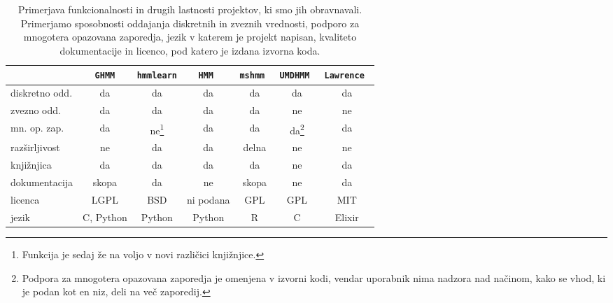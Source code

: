 \begin{table}
\begin{minipage}{\textwidth}
\centering
\small
\begin{tabular}{l|c|c|c|c|c|c}
& {\tt GHMM} & {\tt hmmlearn} & \tt{HMM} & \tt{mshmm} & \tt{UMDHMM} & \tt{Lawrence} \\ \hline
diskretno odd. & da & da & da & da & da & da \\ 
zvezno odd.    & da & da & da & da & ne & ne  \\
mn. op. zap.   & da & ne\footnote{Funkcija je sedaj že na voljo v novi različici knjižnjice.}
                        & da & da & da\footnote{Podpora za mnogotera opazovana zaporedja je omenjena v izvorni kodi, vendar uporabnik nima nadzora nad načinom, kako se vhod, ki je podan kot en niz, deli na več zaporedij.}
                                           & da \\
razširljivost  & ne & da & da & delna & ne & ne \\
knjižnjica  & da & da & da & da & ne & da \\
dokumentacija  & skopa & da & ne & skopa & ne & da \\
licenca        & LGPL & BSD & ni podana & GPL & GPL & MIT \\
jezik          & C, Python & Python & Python & R & C & Elixir \\
\end{tabular}
\caption[Pirmerjava funkcionalnosti projektov]{Primerjava funkcionalnosti in drugih lastnosti projektov, ki smo jih obravnavali. Primerjamo sposobnosti oddajanja diskretnih in zveznih vrednosti, podporo za mnogotera opazovana zaporedja, jezik v katerem je projekt napisan, kvaliteto dokumentacije in licenco, pod katero je izdana izvorna koda.}
\label{tab:compare}
\end{minipage}
\end{table}

